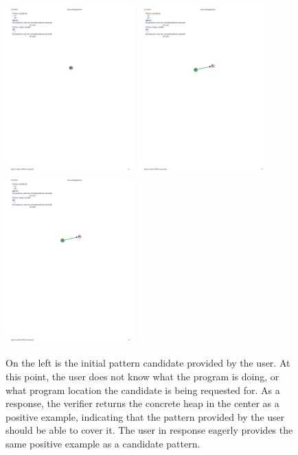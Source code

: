 \begin{figure}
  \centering
  \includegraphics[width=5cm]{fig/just-nil.pdf}
  \includegraphics[width=5cm]{fig/positive1.pdf}
  \includegraphics[width=5cm]{fig/positive1.pdf}
  \caption{On the left is the initial pattern candidate provided by the user. At this point, the user does not know what the program is doing, or what program location the candidate is being requested for. As a response, the verifier returns the concrete heap in the center as a positive example, indicating that the pattern provided by the user should be able to cover it. The user in response eagerly provides the same positive example as a candidate pattern.}
  \label{fig:nil-node}
\end{figure}

